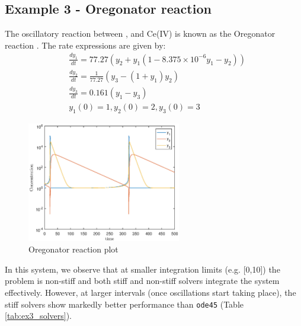 \documentclass[letterpaper,12pt,onehalfspacing,twoside]{article}
\theoremstyle{msds}
\begin{document}
\subsection{Example 3 - Oregonator reaction}
The oscillatory reaction between ,  and Ce(IV) is known as the Oregonator reaction \citep{oregonator}. The rate expressions are given by:
\begin{equation}
\begin{aligned}
&\frac{dy_1}{dt} = 77.27 (y_2 + y_1(1 - 8.375 \times 10^{-6} y_1 - y_2))\\
&\frac{dy_2}{dt} = \frac{1}{77.27} (y_3 - (1 + y_1) y_2)\\
&\frac{dy_3}{dt} = 0.161 (y_1 - y_3)\\
&y_1(0) = 1, y_2(0) = 2, y_3(0) = 3
\end{aligned}
\end{equation}
\begin{figure}[htbp]
\centering
\includegraphics[width=0.6\textwidth]{oregonator.eps}
\caption{Oregonator reaction plot}
\label{fig:ex3_solvers}
\end{figure}
In this system, we observe that at smaller integration limits (e.g. [0,10]) the problem is non-stiff and both stiff and non-stiff solvers integrate the system effectively. However, at larger intervals (once oscillations start taking place), the stiff solvers show markedly better performance than \texttt{ode45} (Table \ref{tab:ex3_solvers}).
 
\end{document}
